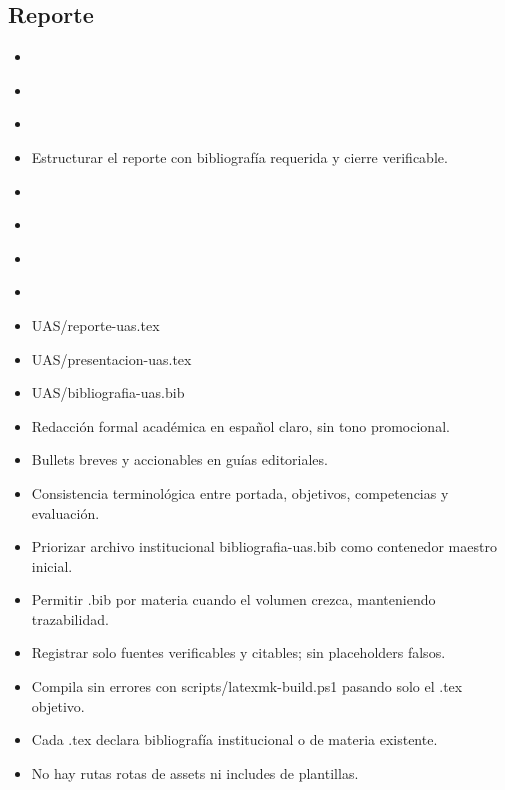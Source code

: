 \documentclass[12pt]{article}
\begin{document}
\subsection*{Reporte}
\begin{itemize}[leftmargin=*]
  \item \\%
  \item \\%
  \item \\%
  \item Estructurar el reporte con bibliografía requerida y cierre verificable.
  \item \\%
  \item \\%
  \item \\%
  \item \\%
  \item UAS/reporte-uas.tex
  \item UAS/presentacion-uas.tex
  \item UAS/bibliografia-uas.bib
  \item Redacción formal académica en español claro, sin tono promocional.
  \item Bullets breves y accionables en guías editoriales.
  \item Consistencia terminológica entre portada, objetivos, competencias y evaluación.
  \item Priorizar archivo institucional bibliografia-uas.bib como contenedor maestro inicial.
  \item Permitir .bib por materia cuando el volumen crezca, manteniendo trazabilidad.
  \item Registrar solo fuentes verificables y citables; sin placeholders falsos.
  \item Compila sin errores con scripts/latexmk-build.ps1 pasando solo el .tex objetivo.
  \item Cada .tex declara bibliografía institucional o de materia existente.
  \item No hay rutas rotas de assets ni includes de plantillas.
\end{itemize}
\end{document}
